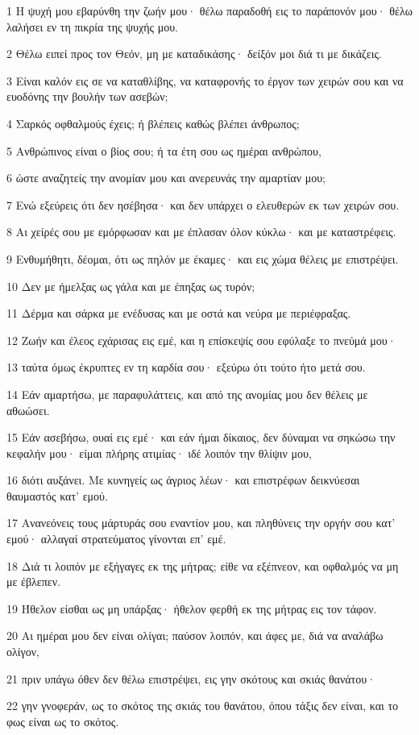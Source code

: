 \par 1 Η ψυχή μου εβαρύνθη την ζωήν μου· θέλω παραδοθή εις το παράπονόν μου· θέλω λαλήσει εν τη πικρία της ψυχής μου.
\par 2 Θέλω ειπεί προς τον Θεόν, μη με καταδικάσης· δείξόν μοι διά τι με δικάζεις.
\par 3 Είναι καλόν εις σε να καταθλίβης, να καταφρονής το έργον των χειρών σου και να ευοδόνης την βουλήν των ασεβών;
\par 4 Σαρκός οφθαλμούς έχεις; ή βλέπεις καθώς βλέπει άνθρωπος;
\par 5 Ανθρώπινος είναι ο βίος σου; ή τα έτη σου ως ημέραι ανθρώπου,
\par 6 ώστε αναζητείς την ανομίαν μου και ανερευνάς την αμαρτίαν μου;
\par 7 Ενώ εξεύρεις ότι δεν ησέβησα· και δεν υπάρχει ο ελευθερών εκ των χειρών σου.
\par 8 Αι χείρές σου με εμόρφωσαν και με έπλασαν όλον κύκλω· και με καταστρέφεις.
\par 9 Ενθυμήθητι, δέομαι, ότι ως πηλόν με έκαμες· και εις χώμα θέλεις με επιστρέψει.
\par 10 Δεν με ήμελξας ως γάλα και με έπηξας ως τυρόν;
\par 11 Δέρμα και σάρκα με ενέδυσας και με οστά και νεύρα με περιέφραξας.
\par 12 Ζωήν και έλεος εχάρισας εις εμέ, και η επίσκεψίς σου εφύλαξε το πνεύμά μου·
\par 13 ταύτα όμως έκρυπτες εν τη καρδία σου· εξεύρω ότι τούτο ήτο μετά σου.
\par 14 Εάν αμαρτήσω, με παραφυλάττεις, και από της ανομίας μου δεν θέλεις με αθωώσει.
\par 15 Εάν ασεβήσω, ουαί εις εμέ· και εάν ήμαι δίκαιος, δεν δύναμαι να σηκώσω την κεφαλήν μου· είμαι πλήρης ατιμίας· ιδέ λοιπόν την θλίψιν μου,
\par 16 διότι αυξάνει. Με κυνηγείς ως άγριος λέων· και επιστρέφων δεικνύεσαι θαυμαστός κατ' εμού.
\par 17 Ανανεόνεις τους μάρτυράς σου εναντίον μου, και πληθύνεις την οργήν σου κατ' εμού· αλλαγαί στρατεύματος γίνονται επ' εμέ.
\par 18 Διά τι λοιπόν με εξήγαγες εκ της μήτρας; είθε να εξέπνεον, και οφθαλμός να μη με έβλεπεν.
\par 19 Ήθελον είσθαι ως μη υπάρξας· ήθελον φερθή εκ της μήτρας εις τον τάφον.
\par 20 Αι ημέραι μου δεν είναι ολίγαι; παύσον λοιπόν, και άφες με, διά να αναλάβω ολίγον,
\par 21 πριν υπάγω όθεν δεν θέλω επιστρέψει, εις γην σκότους και σκιάς θανάτου·
\par 22 γην γνοφεράν, ως το σκότος της σκιάς του θανάτου, όπου τάξις δεν είναι, και το φως είναι ως το σκότος.

